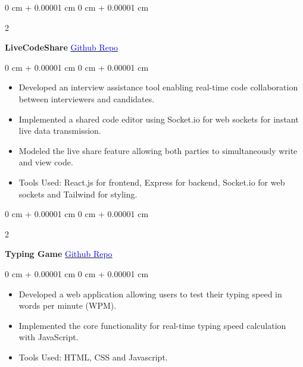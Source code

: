 \documentclass[9pt, letterpaper]{article}
\newenvironment{highlights}{
    \begin{itemize}[
        topsep=0.05 cm,
        parsep=0.05 cm,
        partopsep=0pt,
        itemsep=0pt,
        leftmargin=0 cm + 10pt
    ]
}{
    \end{itemize}
}
\newenvironment{onecolentry}{
    \begin{adjustwidth}{
        0 cm + 0.00001 cm
    }{
        0 cm + 0.00001 cm
    }
}{
    \end{adjustwidth}
}
\newenvironment{twocolentry}[2][]{
    \onecolentry
    \def\secondColumn{#2}
    \setcolumnwidth{\fill, 4 cm}
    \begin{paracol}{2}
}{
    \switchcolumn \raggedleft \secondColumn
    \end{paracol}
    \endonecolentry
}
\begin{document}
        \vspace{0.1 cm}

        \begin{twocolentry}{
            \href{https://github.com/kartik-chausali/LiveCodeShare}{\textcolor{blue}{Github Repo}}
        }
            \textbf{LiveCodeShare}\end{twocolentry}

        \vspace{0.05 cm}
        \begin{onecolentry}
            \begin{highlights}
                \item Developed an interview assistance tool enabling real-time code collaboration between interviewers and candidates.
                \item Implemented a shared code editor using Socket.io for web sockets for instant live data transmission.
                \item Modeled the live share feature allowing both parties to simultaneously write and view code.
                \item Tools Used: React.js for frontend, Express for backend, Socket.io for web sockets and Tailwind for styling.
            \end{highlights}
        \end{onecolentry}

        \vspace{0.1 cm}

        \begin{twocolentry}{
            \href{https://github.com/kartik-chausali/typingGame}{\textcolor{blue}{Github Repo}}
        }
            \textbf{Typing Game}\end{twocolentry}

        \vspace{0.05 cm}
        \begin{onecolentry}
            \begin{highlights}
                \item Developed a web application allowing users to test their typing speed in words per minute (WPM).
                \item Implemented the core functionality for real-time typing speed calculation with JavaScript.
                \item Tools Used: HTML, CSS and Javascript.
            \end{highlights}
        \end{onecolentry}
\end{document}
